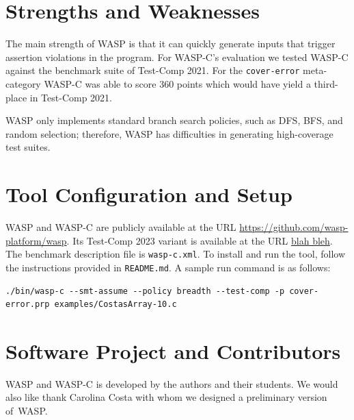 \section{Strengths and Weaknesses}

The main strength of WASP is that it can quickly generate inputs that trigger assertion violations in the program. For WASP-C's evaluation we tested WASP-C against the benchmark suite of Test-Comp 2021. For the \texttt{cover-error} meta-category WASP-C was able to score 360 points which would have yield a third-place in Test-Comp 2021.

WASP only implements standard branch search policies, such as DFS, BFS, and random selection; therefore, WASP has difficulties in generating high-coverage test suites.

\section{Tool Configuration and Setup}

WASP and WASP-C are publicly available at the URL \url{https://github.com/wasp-platform/wasp}. Its Test-Comp 2023 variant is available at the URL \url{blah bleh}. The benchmark description file is \texttt{wasp-c.xml}. To install and run the tool, follow the instructions provided in \texttt{README.md}. A sample run command is as follows:

\begin{verbatim}
./bin/wasp-c --smt-assume --policy breadth --test-comp -p cover-error.prp examples/CostasArray-10.c
\end{verbatim}

\section{Software Project and Contributors}

WASP and WASP-C is developed by the authors and their students. We would also like thank Carolina Costa with whom we designed a preliminary version of~WASP\@.
